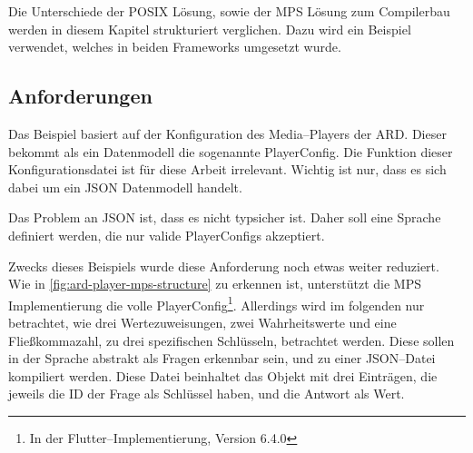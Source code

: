Die Unterschiede der \ac{POSIX} Lösung, sowie der \ac{MPS} Lösung zum Compilerbau werden in diesem Kapitel strukturiert verglichen.
Dazu wird ein Beispiel verwendet, welches in beiden Frameworks umgesetzt wurde.

\subsection{Anforderungen}\label{subsec:anforderungen-ardplayer}
Das Beispiel basiert auf der Konfiguration des Media--Players der \ac{ARD}.
Dieser bekommt als ein Datenmodell die sogenannte {\ttfamily PlayerConfig}.
Die Funktion dieser Konfigurationsdatei ist für diese Arbeit irrelevant.
Wichtig ist nur, dass es sich dabei um ein \ac{JSON} Datenmodell handelt.

Das Problem an \ac{JSON} ist, dass es nicht typsicher ist.
Daher soll eine Sprache definiert werden, die nur valide {\ttfamily PlayerConfig}s akzeptiert.

Zwecks dieses Beispiels wurde diese Anforderung noch etwas weiter reduziert.
Wie in \autoref{fig:ard-player-mps-structure} zu erkennen ist, unterstützt die \ac{MPS} Implementierung die volle {\ttfamily PlayerConfig}\footnote{In der Flutter--Implementierung, Version 6.4.0}.
Allerdings wird im folgenden nur betrachtet, wie drei Wertezuweisungen, zwei Wahrheitswerte und eine Fließkommazahl, zu drei spezifischen Schlüsseln, betrachtet werden.
Diese sollen in der Sprache abstrakt als Fragen erkennbar sein, und zu einer \ac{JSON}--Datei kompiliert werden.
Diese Datei beinhaltet das Objekt mit drei Einträgen, die jeweils die \ac{ID} der Frage als Schlüssel haben, und die Antwort als Wert.


